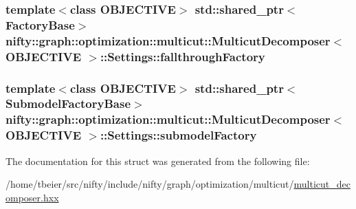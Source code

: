 \subsubsection[{fallthrough\+Factory}]{\setlength{\rightskip}{0pt plus 5cm}template$<$class O\+B\+J\+E\+C\+T\+I\+V\+E$>$ std\+::shared\+\_\+ptr$<${\bf Factory\+Base}$>$ {\bf nifty\+::graph\+::optimization\+::multicut\+::\+Multicut\+Decomposer}$<$ O\+B\+J\+E\+C\+T\+I\+V\+E $>$\+::Settings\+::fallthrough\+Factory}\label{structnifty_1_1graph_1_1optimization_1_1multicut_1_1MulticutDecomposer_1_1Settings_a0144087ab258cf0ce0215bc517f02435}
\hypertarget{structnifty_1_1graph_1_1optimization_1_1multicut_1_1MulticutDecomposer_1_1Settings_af75498fc46f891611d9ef84c20d6d89a}{}
\subsubsection[{submodel\+Factory}]{\setlength{\rightskip}{0pt plus 5cm}template$<$class O\+B\+J\+E\+C\+T\+I\+V\+E$>$ std\+::shared\+\_\+ptr$<${\bf Submodel\+Factory\+Base}$>$ {\bf nifty\+::graph\+::optimization\+::multicut\+::\+Multicut\+Decomposer}$<$ O\+B\+J\+E\+C\+T\+I\+V\+E $>$\+::Settings\+::submodel\+Factory}\label{structnifty_1_1graph_1_1optimization_1_1multicut_1_1MulticutDecomposer_1_1Settings_af75498fc46f891611d9ef84c20d6d89a}


The documentation for this struct was generated from the following file\+:\begin{DoxyCompactItemize}
\item 
/home/tbeier/src/nifty/include/nifty/graph/optimization/multicut/\hyperlink{multicut__decomposer_8hxx}{multicut\+\_\+decomposer.\+hxx}\end{DoxyCompactItemize}

